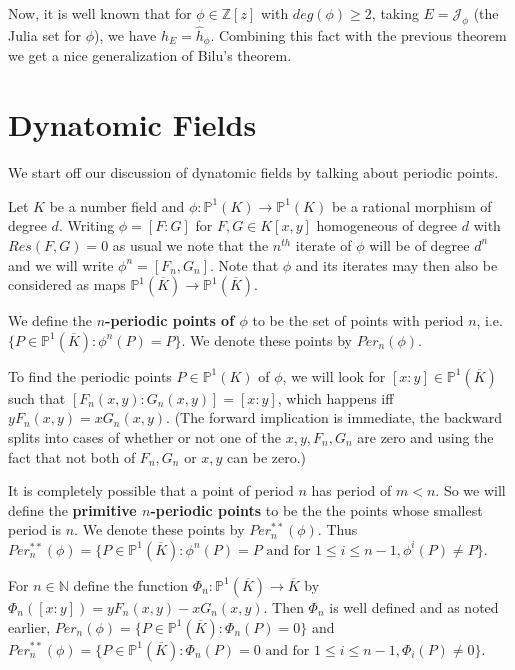 \documentclass[12pt]{amsart}
\theoremstyle{definition}
\theoremstyle{remark}
\theoremstyle{definition}
\newcommand{\N}{\mathbb{N}}
\newcommand{\Z}{\mathbb{Z}}
\renewcommand{\P}{\mathbb{P}}
\newcommand{\MCJ}{\mathcal{J}}
\begin{document}
Now, it is well known that for $\phi \in \Z[z]$ with $deg(\phi) \geq 2$, taking $E = \MCJ_{\phi}$ (the Julia set for $\phi$), we have $h_E = \hat{h}_{\phi}$. Combining this fact with the previous theorem we get a nice generalization of Bilu's theorem. 



\section{Dynatomic Fields} 
 
We start off our discussion of dynatomic fields by talking about periodic points. 

Let $K$ be a number field and $\phi: \P^1(K) \rightarrow \P^1(K)$ be a rational morphism of degree $d$. Writing $\phi = [F:G]$ for $F,G \in K[x,y]$ homogeneous of degree $d$ with $Res(F,G)=0$ as usual we note that the $n^{th}$ iterate of $\phi$ will be of degree $d^n$ and we will write $\phi^n = [F_n,G_n]$. Note that $\phi$ and its iterates may then also be considered as maps $\P^1(\overline{K}) \rightarrow \P^1(\overline{K})$.

We define the \textbf{$n$-periodic points of $\phi$} to be the set of points with period $n$, i.e. $\{P \in \P^1(\overline{K}): \phi^n(P) = P \}$. We denote these points by $Per_n(\phi)$.

To find the periodic points $P \in \P^1(K)$ of $\phi$, we will look for $[x:y] \in \P^1(\overline{K})$ such that $[F_n(x,y):G_n(x,y)] = [x:y]$, which happens iff $yF_n(x,y) = xG_n(x,y)$. (The forward implication is immediate, the backward splits into cases of whether or not one of the $x,y,F_n,G_n$ are zero and using the fact that not both of $F_n,G_n$ or $x,y$ can be zero.)

It is completely possible that a point of period $n$ has period of $m<n$. So we will define the \textbf{primitive $n$-periodic points} to be the the points whose smallest period is $n$. We denote these points by $Per_n^{**}(\phi)$. Thus $Per_n^{**}(\phi) = \{P \in \P^1(\overline{K}): \phi^n(P) = P \text{ and for } 1\leq i \leq n-1, \phi^i(P) \neq P\}$.

For $n \in \N$ define the function $\Phi_n: \P^1(\overline{K}) \rightarrow \overline{K}$ by $\Phi_n([x:y]) = yF_n(x,y) - xG_n(x,y)$. Then $\Phi_n$ is well defined and as noted earlier, $Per_n(\phi) = \{P \in \P^1(\overline{K}): \Phi_n(P) = 0\}$ and $Per_n^{**}(\phi) = \{P \in \P^1(\overline{K}): \Phi_n(P) = 0 \text{ and for } 1\leq i \leq n-1, \Phi_i(P) \neq 0\}$. 
\end{document}
